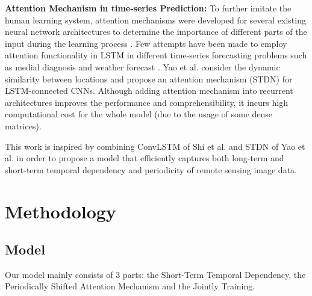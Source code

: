 \textbf{Attention Mechanism in time-series Prediction:} To further imitate the human learning system, attention mechanisms were developed for several existing neural network architectures to determine the importance of different parts of the input during the learning process \cite{Bahdanau2015NeuralMT} \cite{DBLP:journals/corr/XuBKCCSZB15} \cite{DBLP:journals/corr/MnihHGK14} \cite{DBLP:journals/corr/ChenWCGXN15}. Few attempts have been made to employ attention functionality in LSTM in different time-series forecasting problems such as medial diagnosis \cite{DBLP:journals/corr/ChoiBSSS16} and weather forecast \cite{Riemer:2016:CFM:3045390.3045707}. Yao et al. \cite{DBLP:journals/corr/abs-1803-01254} consider the dynamic similarity between locations and propose an attention mechanism (STDN) for LSTM-connected CNNs. Although adding attention mechanism into recurrent architectures improves the performance and comprehensibility, it incurs high computational cost for the whole model (due to the usage of some dense matrices).

This work is inspired by combining ConvLSTM \cite{Shi2015ConvolutionalLN} of Shi et al. and STDN \cite{DBLP:journals/corr/abs-1803-01254} of Yao et al. in order to propose a model that efficiently captures both long-term and short-term temporal dependency and periodicity of remote sensing image data.

\section{Methodology}
\subsection{Model}
Our model mainly consists of 3 parts: the Short-Term Temporal Dependency, the Periodically Shifted Attention Mechanism and the Jointly Training.

